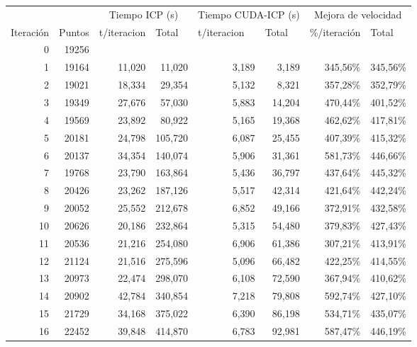 \begin{table}[h]
    \centering
      \begin{tabular}{rrrrrrrr}
            &       & \multicolumn{2}{c}{Tiempo ICP (s)} & \multicolumn{2}{c}{Tiempo CUDA-ICP (s)} & \multicolumn{2}{c}{Mejora de velocidad} \\
      \multicolumn{1}{l}{Iteración} & \multicolumn{1}{l}{Puntos} & \multicolumn{1}{l}{t/iteracion} & \multicolumn{1}{l}{Total} & \multicolumn{1}{l}{t/iteracion} & \multicolumn{1}{l}{Total} & \multicolumn{1}{l}{\%/iteración} & \multicolumn{1}{l}{Total} \\
      0     & 19256 &       &       &       &       &       &  \\
      1     & 19164 & 11,020 & 11,020 & 3,189 & 3,189 & 345,56\% & 345,56\% \\
      2     & 19021 & 18,334 & 29,354 & 5,132 & 8,321 & 357,28\% & 352,79\% \\
      3     & 19349 & 27,676 & 57,030 & 5,883 & 14,204 & 470,44\% & 401,52\% \\
      4     & 19569 & 23,892 & 80,922 & 5,165 & 19,368 & 462,62\% & 417,81\% \\
      5     & 20181 & 24,798 & 105,720 & 6,087 & 25,455 & 407,39\% & 415,32\% \\
      6     & 20137 & 34,354 & 140,074 & 5,906 & 31,361 & 581,73\% & 446,66\% \\
      7     & 19768 & 23,790 & 163,864 & 5,436 & 36,797 & 437,64\% & 445,32\% \\
      8     & 20426 & 23,262 & 187,126 & 5,517 & 42,314 & 421,64\% & 442,24\% \\
      9     & 20052 & 25,552 & 212,678 & 6,852 & 49,166 & 372,91\% & 432,58\% \\
      10    & 20626 & 20,186 & 232,864 & 5,315 & 54,480 & 379,83\% & 427,43\% \\
      11    & 20536 & 21,216 & 254,080 & 6,906 & 61,386 & 307,21\% & 413,91\% \\
      12    & 21124 & 21,516 & 275,596 & 5,096 & 66,482 & 422,25\% & 414,55\% \\
      13    & 20973 & 22,474 & 298,070 & 6,108 & 72,590 & 367,94\% & 410,62\% \\
      14    & 20902 & 42,784 & 340,854 & 7,218 & 79,808 & 592,74\% & 427,10\% \\
      15    & 21729 & 34,168 & 375,022 & 6,390 & 86,198 & 534,71\% & 435,07\% \\
      16    & 22452 & 39,848 & 414,870 & 6,783 & 92,981 & 587,47\% & 446,19\% \\

\end{tabular}
\end{table}
